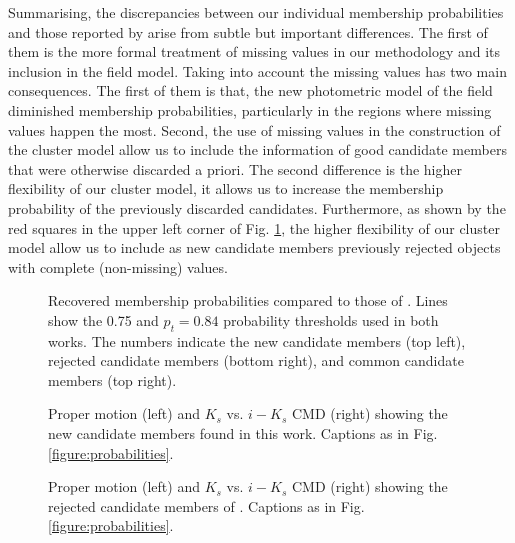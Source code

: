Summarising, the discrepancies between our individual membership probabilities and those reported by \citet{Bouy2015} arise from subtle but important differences. The first of them is the more formal treatment of missing values in our methodology and its inclusion in the field model. Taking into account the missing values has two main consequences. The first of them is that, the new photometric model of the field diminished membership probabilities, particularly in the regions where missing values happen the most. Second, the use of missing values in the construction of the cluster model allow us to include the information of good candidate members that were otherwise discarded a priori. The second difference is the higher flexibility of our cluster model, it allows us to increase the membership probability of the previously discarded candidates. Furthermore, as shown by the red squares in the upper left corner of Fig. \ref{figure:HM-SBB}, the higher flexibility of our cluster model allow us to include as new candidate members previously rejected objects with complete (non-missing) values.  

\begin{figure}[htbp]
\begin{center}
\caption{Recovered membership probabilities compared to those of \citet{Bouy2015}. Lines show the 0.75 and $p_t=0.84$ probability thresholds used in both works. The numbers indicate the new candidate members (top left), rejected candidate members (bottom right), and common candidate members (top right).}
\label{figure:HM-SBB}
\end{center}
\end{figure}


 \begin{figure}[htbp]
\begin{center}
\caption{Proper motion (left) and $K_s$ vs. $i-K_s$ CMD (right) showing the new candidate members found in this work. Captions as in Fig. \ref{figure:probabilities}.}
\label{figure:newones}
\end{center}
\end{figure}

 \begin{figure}[htbp]
\begin{center}
\caption{Proper motion (left) and $K_s$ vs. $i-K_s$ CMD (right) showing the rejected candidate members of \citet{Bouy2015}. Captions as in Fig. \ref{figure:probabilities}.}
\label{figure:rejecteds}
\end{center}
\end{figure}

